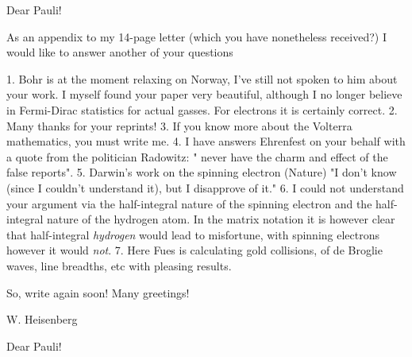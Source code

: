 \documentclass{article}
\begin{document}
\date{March 2, 1927}

Dear Pauli!

As an appendix to my 14-page letter (which you have nonetheless received?) I would like to answer another of your questions


1. Bohr is at the moment relaxing on Norway, I've still not spoken to him about your work. I myself found your paper very beautiful, although I no longer believe in Fermi-Dirac statistics for actual gasses. For electrons it is certainly correct. 2. Many thanks for your reprints! 3. If you know more about the Volterra mathematics, you must write me. 4. I have answers Ehrenfest on your behalf with a quote from the politician Radowitz: " never have the charm and effect of the false reports". 5. Darwin's work on the spinning electron (Nature) "I don't know (since I couldn't understand it), but I disapprove of it." 6. I could not understand your argument via the half-integral nature of the spinning electron and the  half-integral nature of the hydrogen atom. In the matrix notation it is however clear that half-integral \textit{hydrogen} would lead to misfortune, with spinning electrons however it would \textit{not}. 7. Here Fues is calculating gold collisions,  of de Broglie waves, line breadths, etc with pleasing results.

So, write again soon! Many greetings!

W. Heisenberg

\date{March 9, 1927}

Dear Pauli!
\end{document}
